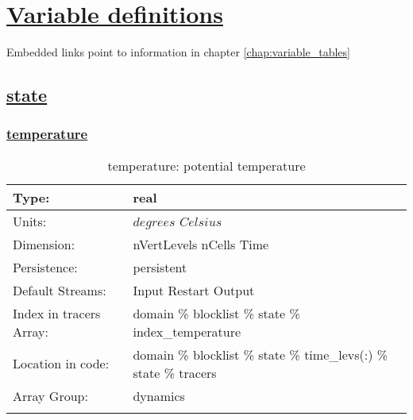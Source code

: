 \chapter[Variable definitions]{\hyperref[chap:variable_tables]{Variable definitions}}
\label{chap:variable_sections}
Embedded links point to information in chapter \ref{chap:variable_tables}
\section[state]{\hyperref[sec:var_tab_state]{state}}
\label{sec:var_sec_state}
\subsection[temperature]{\hyperref[sec:var_tab_state]{temperature}}
\label{subsec:var_sec_state_temperature}
\begin{center}
\begin{longtable}{| p{2.0in} | p{4.0in} |}
        \hline 
        Type: & real \\
        \hline 
        Units: & $degrees$ $Celsius$ \\
        \hline 
        Dimension: & nVertLevels nCells Time \\
        \hline 
        Persistence: & persistent \\
        \hline 
		 Default Streams: & Input Restart Output  \\
        \hline 
		 Index in tracers Array: & domain \% blocklist \% state \% index\_temperature \\
		 \hline 
		 Location in code: & domain \% blocklist \% state \% time\_levs(:) \% state \% tracers \\
		 \hline 
		 Array Group: & dynamics \\
		 \hline 
    \caption{temperature: potential temperature}
\end{longtable}
\end{center}
